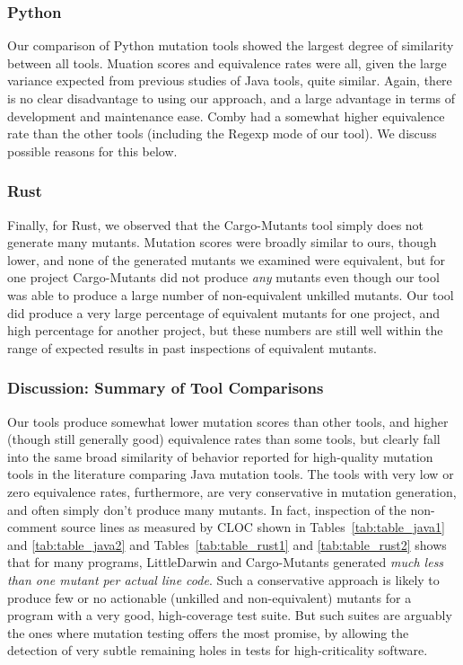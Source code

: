 \documentclass[sigconf,review, anonymous]{acmart}
\begin{document}
\subsubsection{Python}

Our comparison of Python mutation tools showed the largest degree of
similarity between all tools.  Muation scores and equivalence rates
were all, given the large variance expected from previous studies of
Java tools, quite similar.  Again, there is no clear disadvantage to
using our approach, and a large advantage in terms of development and
maintenance ease.  Comby had a somewhat higher equivalence rate than the
other tools (including the Regexp mode of our tool).  We discuss
possible reasons for this below.

\subsubsection{Rust}

Finally, for Rust, we observed that the Cargo-Mutants tool simply does
not generate many mutants.  Mutation scores were broadly similar to
ours, though lower, and none of the generated mutants we examined were
equivalent, but for one project Cargo-Mutants did not produce
\emph{any} mutants even though our tool was able to produce a large
number of non-equivalent unkilled mutants.  Our tool did produce a
very large percentage of equivalent mutants for one project, and high
percentage for another project, but these numbers are still well
within the range of expected results in past inspections of
equivalent mutants.

\subsubsection{Discussion: Summary of Tool Comparisons}

Our tools produce somewhat lower mutation scores than other tools, and
higher (though still generally good) equivalence rates than some
tools, but clearly fall into the same broad similarity of behavior
reported for high-quality mutation tools in the literature comparing
Java mutation tools.   The tools with very low or zero equivalence rates, furthermore,
are very conservative in mutation generation, and often simply don't
produce many mutants.  In fact, inspection of the non-comment source
lines as measured by CLOC shown in Tables~\ref{tab:table_java1} and
\ref{tab:table_java2} and Tables~\ref{tab:table_rust1} and
\ref{tab:table_rust2} shows that for many programs, LittleDarwin and
Cargo-Mutants generated \emph{much less than one mutant per actual
  line code}.  Such a conservative approach is likely to produce few
or no actionable (unkilled and non-equivalent) mutants for a program
with a very good, high-coverage test suite.  But such suites are
arguably the ones where mutation testing offers the most promise, by
allowing the detection of very subtle remaining holes in tests for
high-criticality software.
\end{document}
